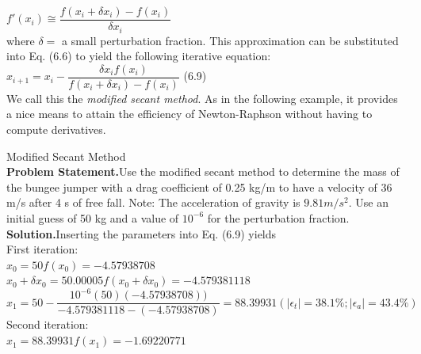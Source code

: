 \documentclass[../main.tex]{subfiles}
\begin{document}
$f'(x_i)\cong \dfrac{f(x_i+\delta x_i)-f(x_i)}{\delta x_i}$\\

\noindent where $\delta =$ a small perturbation fraction. This approximation can be substituted into
Eq. (6.6) to yield the following iterative equation:\\

$x_{i+1} = x_i-\dfrac{\delta x_i f(x_i)}{f(x_i + \delta x_i)-f(x_i)}$
\hfill (6.9)\\

We call this the \emph{modified secant method}. As in the following example, it provides a nice
means to attain the efficiency of Newton-Raphson without having to compute derivatives.\\

\begin{example} Modified Secant Method\\

    \noindent\textbf{Problem Statement.}\quad Use the modified secant method to determine the mass of the
    bungee jumper with a drag coefficient of 0.25 kg/m to have a velocity of 36 m/s after 4 s of
    free fall. Note: The acceleration of gravity is $9.81 m/s^2$. Use an initial guess of 50 kg and a
    value of $10^{-6}$ for the perturbation fraction.\\

    \noindent\textbf{Solution.}\quad Inserting the parameters into Eq. (6.9) yields\\

    \noindent First iteration:\\

    $x_0 = 50$\hspace{28.5mm}$f(x_0) = -4.57938708$\\

    $x_0 + \delta x_0 = 50.00005$\hspace{10mm}$f(x_0+\delta x_0) = -4.579381118$\\

    $x_1 = 50-\dfrac{10^{-6}(50)(-4.57938708))}{-4.579381118 - (-4.57938708)}=
    88.39931(\left\lvert \epsilon_t \right\rvert = 38.1\%; \left\lvert \epsilon_a \right\rvert =43.4\% )$\\

    \noindent Second iteration:\\

    $x_1 = 88.39931$\hspace{20mm}$f(x_1) = -1.69220771$\\


\end{example}
\end{document}
